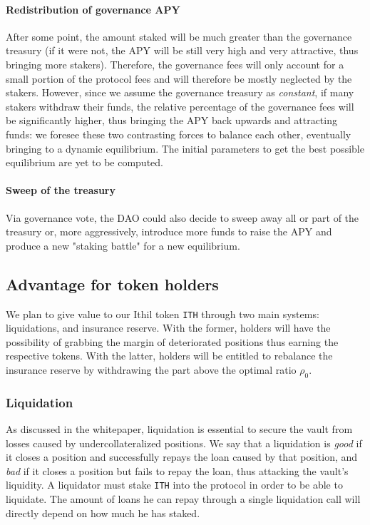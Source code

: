 \documentclass[a4paper,10 pt]{article}
\theoremstyle{definition}
\begin{document}
\paragraph{Redistribution of governance APY}
After some point, the amount staked will be much greater than the governance treasury (if it were not, the APY will be still very high and very attractive, thus bringing more stakers). Therefore, the governance fees will only account for a small portion of the protocol fees and will therefore be mostly neglected by the stakers. However, since we assume the governance treasury as {\it constant}, if many stakers withdraw their funds, the relative percentage of the governance fees will be significantly higher, thus bringing the APY back upwards and attracting funds: we foresee these two contrasting forces to balance each other, eventually bringing to a dynamic equilibrium. The initial parameters to get the best possible equilibrium are yet to be computed.

\paragraph{Sweep of the treasury}
Via governance vote, the DAO could also decide to sweep away all or part of the treasury or, more aggressively, introduce more funds to raise the APY and produce a new "staking battle" for a new equilibrium.

\subsection{Advantage for token holders}

We plan to give value to our Ithil token \verb|ITH| through two main systems: liquidations, and insurance reserve. With the former, holders will have the possibility of grabbing the margin of deteriorated positions thus earning the respective tokens. With the latter, holders will be entitled to rebalance the insurance reserve by withdrawing the part above the optimal ratio $\rho_0$.

\subsubsection{Liquidation}

As discussed in the whitepaper, liquidation is essential to secure the vault from losses caused by undercollateralized positions. We say that a liquidation is {\it good} if it closes a position and successfully repays the loan caused by that position, and {\it bad} if it closes a position but fails to repay the loan, thus attacking the vault's liquidity. A liquidator must stake \verb|ITH| into the protocol in order to be able to liquidate. The amount of loans he can repay through a single liquidation call will directly depend on how much he has staked.
\end{document}
